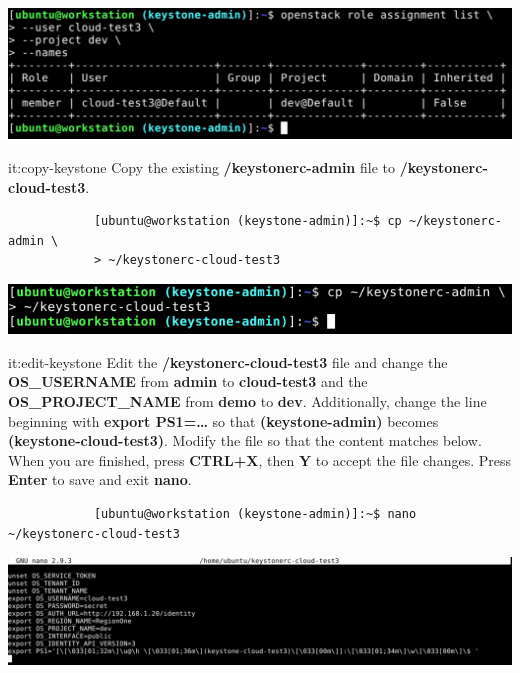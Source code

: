 \documentclass[letterpaper, 12pt]{article}
\begin{document}
\begin{enumerate}
\begin{labstep}
        \begin{center}
            \includegraphics[width=\linewidth]{images/part4/step10.png}
        \end{center}
    \end{labstep}

    \begin{labstep}{it:copy-keystone}
        Copy the existing \textbf{\texttildemid/keystonerc-admin} file to \textbf{\texttildemid/keystonerc-cloud-test3}.
        \begin{lstlisting}
            [ubuntu@workstation (keystone-admin)]:~$ cp ~/keystonerc-admin \
            > ~/keystonerc-cloud-test3
        \end{lstlisting}

        \begin{center}
            \includegraphics[width=\linewidth]{images/part4/step11.png}
        \end{center}
    \end{labstep}

    \begin{labstep}{it:edit-keystone}
        Edit the \textbf{\texttildemid/keystonerc-cloud-test3} file and change the \textbf{OS\_USERNAME} from \textbf{admin} to \textbf{cloud-test3} and the \textbf{OS\_PROJECT\_NAME} from \textbf{demo} to \textbf{dev}.
        Additionally, change the line beginning with \textbf{export PS1=…} so that \textbf{(keystone-admin)} becomes \textbf{(keystone-cloud-test3)}.
        Modify the file so that the content matches below.
        When you are finished, press \textbf{CTRL+X}, then \textbf{Y} to accept the file changes.
        Press \textbf{Enter} to save and exit \textbf{nano}.
        \begin{lstlisting}
            [ubuntu@workstation (keystone-admin)]:~$ nano ~/keystonerc-cloud-test3
        \end{lstlisting}

        \begin{center}
            \includegraphics[width=\linewidth]{images/part4/step12.png}
        \end{center}
    \end{labstep}


\end{enumerate}
\end{document}

